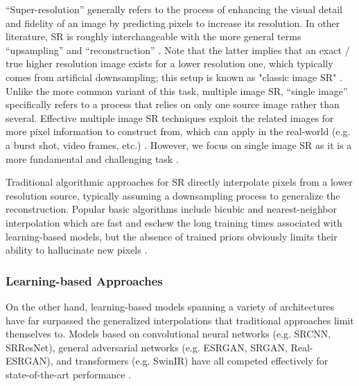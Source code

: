 \documentclass{article}
\begin{document}
“Super-resolution” generally refers to the process of enhancing the visual detail and fidelity of an image by predicting pixels to increase its resolution. In other literature, SR is roughly interchangeable with the more general terms “upsampling” and “reconstruction” \citep{Overview, ESRGAN}. Note that the latter implies that an exact / true higher resolution image exists for a lower resolution one, which typically comes from artificial downsampling; this setup is known as "classic image SR" \citep{SRGAN, SwinIR}. Unlike the more common variant of this task, multiple image SR, “single image” specifically refers to a process that relies on only one source image rather than several. Effective multiple image SR techniques exploit the related images for more pixel information to construct from, which can apply in the real-world (e.g. a burst shot, video frames, etc.) \citep{Overview, DLSS}. However, we focus on single image SR as it is a more fundamental and challenging task \citep{DLSS}.

Traditional algorithmic approaches for SR directly interpolate pixels from a lower resolution source, typically assuming a downsampling process to generalize the reconstruction. Popular basic algorithms include bicubic and nearest-neighbor interpolation which are fast and eschew the long training times associated with learning-based models, but the absence of trained priors obviously limits their ability to hallucinate new pixels \citep{Overview, DLSS}.

\subsubsection{Learning-based Approaches}

On the other hand, learning-based models spanning a variety of architectures have far surpassed the generalized interpolations that traditional approaches limit themselves to. Models based on convolutional neural networks (e.g. SRCNN, SRResNet), general adversarial networks (e.g. ESRGAN, SRGAN, Real-ESRGAN), and transformers (e.g. SwinIR) have all competed effectively for state-of-the-art performance \citep{SRCNN, SRGAN, ESRGAN, SwinIR}.
\end{document}
